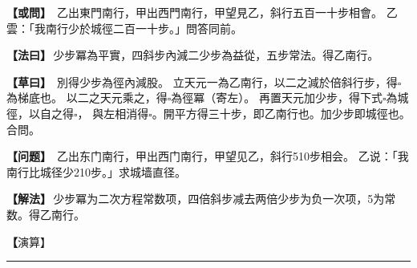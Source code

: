 \documentclass[11pt,a4paper]{article}
\let\origsquare\square
\renewcommand{\square}{\ensuremath{\origsquare}}%
\newcommand{\longline}{\noindent\rule{\textwidth}{0.4pt}}
\newcommand{\clOWEN}[1]{%
  \par\vspace{0.3em}%
  \noindent\textcolor{problemcolor}{\textbf{【或問】}}\,{\tradfont #1}\par\nopagebreak%
}
\newcommand{\mdOWEN}[1]{%
  \par\vspace{0.3em}%
  \noindent\textcolor{problemcolor}{\textbf{【问题】}}\,{\modfont #1}\par\nopagebreak%
}
\newcommand{\clFAYUE}[1]{%
  \par\noindent\textcolor{methodcolor}{\textbf{【法曰】}}\,{\tradfont #1}\par\nopagebreak%
}
\newcommand{\mdFAYUE}[1]{%
  \par\noindent\textcolor{methodcolor}{\textbf{【解法】}}\,{\modfont #1}\par\nopagebreak%
}
\newcommand{\clTSAOYUE}[1]{%
  \par\noindent\textcolor{workcolor}{\textbf{【草曰】}}\,{\tradfont #1}\par%
}
\newcommand{\mdTSAOYUE}[1]{%
  \par\noindent\textcolor{workcolor}{\textbf【演算】}}\,{\modfont #1}\par%
\begin{document}
\begin{paracol}{2}

\begin{leftcolumn}
\clOWEN{%
乙出東門南行，甲出西門南行，甲望見乙，斜行五百一十步相會。
乙雲：「我南行少於城徑二百一十步。」問答同前。}

\clFAYUE{少步冪為平實，四斜步內減二少步為益從，五步常法。得乙南行。}

\clTSAOYUE{%
別得少步為徑內減股。
立天元一為乙南行，以二之減於倍斜行步，得$\square$為梯底也。
以二之天元乘之，得$\square$為徑冪（寄左）。
再置天元加少步，得下式$\square$為城徑，以自之得$\square$，
與左相消得$\square$。開平方得三十步，即乙南行也。加少步即城徑也。合問。}
\end{leftcolumn}

\switchcolumn

\begin{rightcolumn}
\mdOWEN{%
乙出东门南行，甲出西门南行，甲望见乙，斜行510步相会。
乙说：「我南行比城径少210步。」求城墙直径。}

\mdFAYUE{少步冪为二次方程常数项，四倍斜步减去两倍少步为负一次项，5为常数。得乙南行。}

\mdTSAOYUE{%
辨识得：少步为径减股。
设天元一为乙南行，两倍后从两倍斜行步中减去，得$\square$为梯底。
以两倍天元乘之，得$\square$为径冪（寄左）。
再置天元加少步，得下式$\square$为城径，自乘得$\square$，
与左式相消得$\square$。开平方得30步，即乙南行。加少步即城径。符合所问。}
\end{rightcolumn}

\end{paracol}

\vspace{0.3cm}
\begin{center}\longline\end{center}
\end{document}
